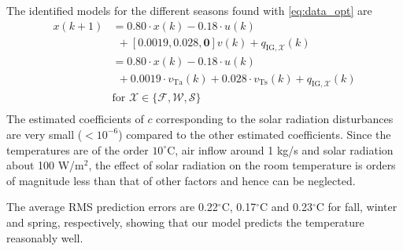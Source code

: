 The identified models for the different seasons found with \eqref{eq:data_opt} are
\begin{equation}\label{eq:lumped_zone_res}
\begin{aligned}
x(k+1) & = 0.80\cdot x(k) - 0.18\cdot u(k) \\
 & ~~ + \left[0.0019, 0.028, \mathbf{0} \right] v(k) + q_{\text{IG},\mathcal{X}}(k) \\
 & =  0.80\cdot x(k) - 0.18\cdot u(k) \\
 & ~~ + 0.0019 \cdot v_{\text{Ta}}(k) + 0.028 \cdot v_{\text{Ts}}(k) + q_{\text{IG},\mathcal{X}}(k) \\
 & \text{for } \mathcal{X} \in \lbrace \mathcal{F}, \mathcal{W}, \mathcal{S} \rbrace\\
\end{aligned}
\end{equation}
The estimated coefficients of $c$ corresponding to the solar radiation disturbances are very small ($< 10^{-6}$) compared to the other estimated coefficients. Since the temperatures are of the order $10^{\circ}$C, air inflow around 1 kg/s and solar radiation about 100 W/m$^2$, the effect of solar radiation on the room temperature is orders of magnitude less than that of other factors and hence can be neglected.

The average RMS prediction errors are 0.22$^{\circ}$C, 0.17$^{\circ}$C and 0.23$^{\circ}$C for fall, winter and spring, respectively, showing that our model predicts the temperature reasonably well. 



